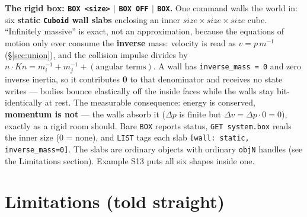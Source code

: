 \documentclass[11pt]{article}
\newcommand{\code}[1]{\texttt{#1}}
\begin{document}
\textbf{The rigid box: \code{BOX <size>} $|$ \code{BOX OFF} $|$
\code{BOX}.} One command walls the world in: six \textbf{static
\code{Cuboid} wall slabs} enclosing an inner
$\mathit{size}\times\mathit{size}\times\mathit{size}$ cube.
``Infinitely massive'' is exact, not an approximation, because the
equations of motion only ever consume the \textbf{inverse} mass:
velocity is read as $v = p\,m^{-1}$ (\S\ref{sec:union}), and the
collision impulse divides by
$n\!\cdot\!Kn = m_i^{-1} + m_j^{-1} + (\text{angular terms})$. A wall
has \code{inverse\_mass = 0} and zero inverse inertia, so it
contributes \textbf{0} to that denominator and receives no state
writes --- bodies bounce elastically off the inside faces while the
walls stay bit-identically at rest. The measurable consequence: energy
is conserved, \textbf{momentum is not} --- the walls absorb it
($\Delta p$ is finite but $\Delta v = \Delta p\cdot 0 = 0$), exactly
as a rigid room should. Bare \code{BOX} reports status,
\code{GET system.box} reads the inner size (0 = none), and \code{LIST}
tags each slab \code{[wall: static, inverse\_mass=0]}. The slabs are
ordinary objects with ordinary \code{objN} handles (see the
Limitations section). Example S13 puts all six shapes inside one.

\section{Limitations (told straight)}
\end{document}
